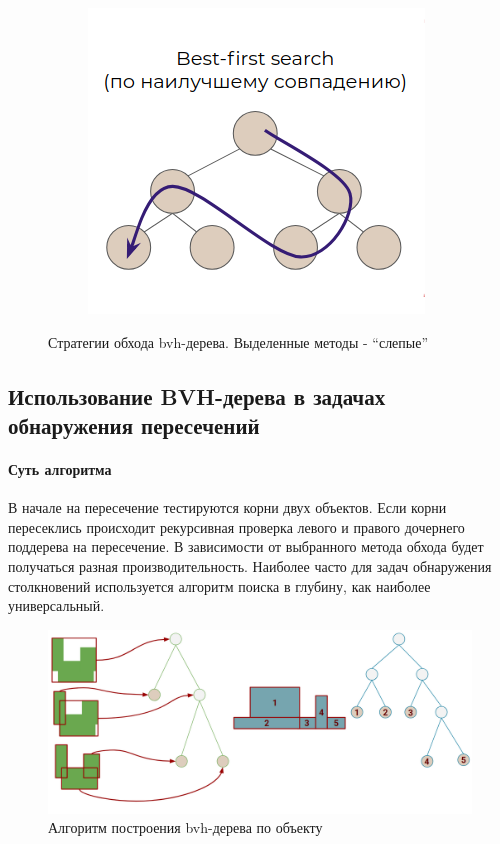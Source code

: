 \documentclass[11pt,a4paper]{extarticle}
\begin{document}
\begin{figure}[ht]
\begin{subfigure}{2in}
					\caption{}
					\label{bvhtravers2}					
				\end{subfigure}
				\begin{subfigure}{2in}
					\includegraphics[width=\textwidth]{bvhtravers3}					
					\caption{}
					\label{bvhtravers3}
			\end{subfigure}
				\caption{Стратегии обхода bvh-дерева. Выделенные методы - “слепые”}
				\label{bvhtravers}
			\end{figure}

		\subsection{Использование BVH-дерева в задачах обнаружения пересечений}
			\paragraph{Суть алгоритма}
			В начале на пересечение тестируются корни двух объектов.
			Если корни пересеклись происходит рекурсивная проверка левого и правого дочернего поддерева на пересечение.
			В зависимости от выбранного метода обхода будет получаться разная производительность.
			Наиболее часто для задач обнаружения столкновений используется алгоритм поиска в глубину, как наиболее универсальный.
			\begin{figure}[ht]
				\centering
				\includegraphics[width=\textwidth]{bvhcd}
				\caption{Алгоритм построения bvh-дерева по объекту}
			\end{figure}
	\newpage
\end{document}
